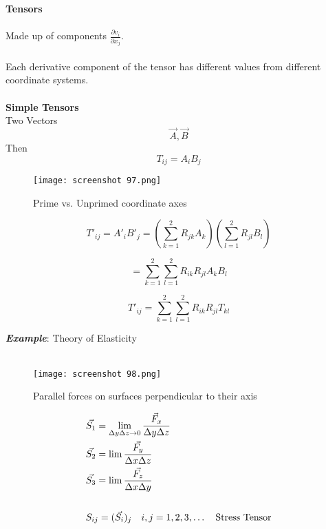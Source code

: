 \documentclass[svgnames]{article}   	%
\begin{document}
\textbf{Tensors} 
\mbox{}\\\\
Made up of components $ \frac{\partial v_i}{\partial x_j} $.
\\\\ Each derivative component of the tensor has different values from different coordinate systems. 
\mbox{}\\\\
\textbf{Simple Tensors}
\mbox{}\\

Two Vectors
\[ \vec{A}, \vec{B} \]
Then 
\[
  T_{ij} = A_i B_j 
\]

\begin{figure}[H]
  \centering
    \texttt{[image: screenshot 97.png]}
    \caption{Prime vs. Unprimed coordinate axes}
\end{figure}



\[
  T'_{ij} = A'_i B'_j = \left(\sum_{k=1}^2 R_{jk} A_k \right)\left( \sum_{l
  = 1}^2 R_{jl} B_l \right)
\]

\[
  = \sum_{k=1}^2 \sum_{l=1}^2 R_{ik} R_{jl} A_k B_l
\]

\begin{tcolorbox}[title = Tensor Transformation Law]

\[
  T'_{ij} = \sum_{k=1}^{2} \sum_{l=1}^{2} R_{ik} R_{jl} T_{kl}
\]

\end{tcolorbox} 
\vspace{10px} 
\textit{ \textbf{Example}}: Theory of Elasticity 
\\\\


\begin{figure}[H]
  \centering
    \texttt{[image: screenshot 98.png]}
    \caption{Parallel forces on surfaces perpendicular to their axis}
\end{figure}



\begin{align*}
  &\vec{S_1} = \lim_{\Delta y \Delta z \to 0} \frac{\vec{F}_x}{\Delta y \Delta 
  z} \\
  &\vec{S_2} = \lim \frac{\vec{F_y}}{\Delta x \Delta z}\\
  &\vec{S_3} = \lim \frac{\vec{F_z}}{\Delta x \Delta y} \\\\
  & S_{ij} = (\vec{S_i})_j \hspace{10px} i,j = 1,2,3,\dots \hspace{10px}
  \text{Stress Tensor} 
\end{align*}
\end{document}
